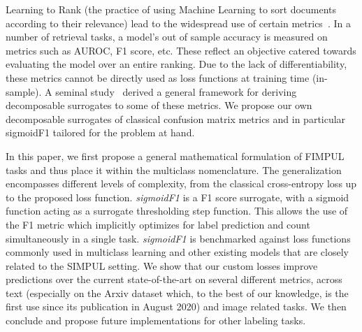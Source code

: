 
Learning to Rank (the practice of using Machine Learning to sort documents according to their relevance) lead to the widespread use of certain metrics~\cite{LTR}. In a number of retrieval tasks, a model's out of sample accuracy is measured on metrics such as AUROC, F1 score, etc. These reflect an objective catered towards evaluating the model over an entire ranking. Due to the lack of differentiability, these metrics cannot be directly used as loss functions at training time (in-sample). A seminal study~\cite{optimizableLosses} derived a general framework for deriving decomposable surrogates to some of these metrics. We propose our own decomposable surrogates of classical confusion matrix metrics and in particular sigmoidF1 tailored for the problem at hand.

In this paper, we first propose a general mathematical formulation of FIMPUL tasks and thus place it within the multiclass nomenclature. The generalization encompasses different levels of complexity, from the classical cross-entropy loss up to the proposed loss function. \emph{sigmoidF1} is a F1 score surrogate, with a sigmoid function acting as a surrogate thresholding step function. This allows the use of the F1 metric which implicitly optimizes for label prediction and count simultaneously in a single task.  \emph{sigmoidF1} is benchmarked against loss functions commonly used in multiclass learning and other existing models that are closely related to the SIMPUL setting. We show that our custom losses improve predictions over the current state-of-the-art on several different metrics, across text (especially on the Arxiv dataset which, to the best of our knowledge, is the first use since its publication in August 2020) and image related tasks. We then conclude and propose future implementations for other labeling tasks.





